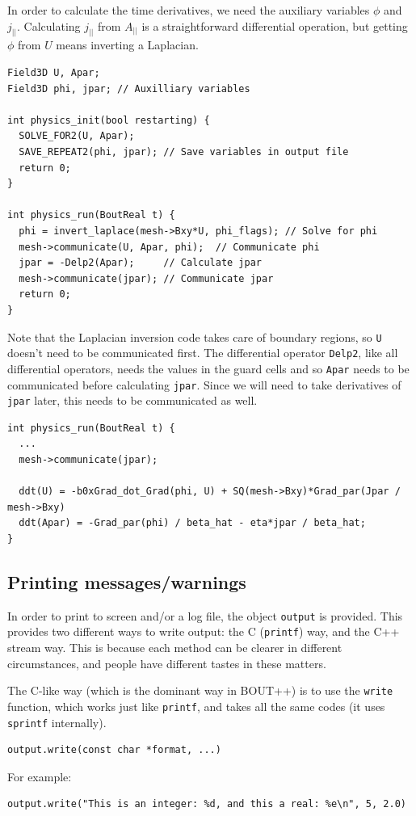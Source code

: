 \documentclass[12pt]{article}
\newcommand{\code}[1]{\texttt{#1}}
\begin{document}
In order to calculate the time derivatives, we need the auxiliary variables
$\phi$ and $j_{||}$. Calculating $j_{||}$ from $A_{||}$ is a straightforward
differential operation, but getting $\phi$ from $U$ means inverting a Laplacian.
\begin{lstlisting}
Field3D U, Apar;
Field3D phi, jpar; // Auxilliary variables

int physics_init(bool restarting) {
  SOLVE_FOR2(U, Apar);
  SAVE_REPEAT2(phi, jpar); // Save variables in output file
  return 0;
}

int physics_run(BoutReal t) {
  phi = invert_laplace(mesh->Bxy*U, phi_flags); // Solve for phi
  mesh->communicate(U, Apar, phi);  // Communicate phi
  jpar = -Delp2(Apar);     // Calculate jpar
  mesh->communicate(jpar); // Communicate jpar
  return 0;
}
\end{lstlisting}
Note that the Laplacian inversion code takes care of boundary regions,
so \lstinline!U! doesn't need to be communicated first. The differential operator
\lstinline!Delp2!, like all differential operators, needs the values
in the guard cells and so \lstinline!Apar! needs to be communicated
before calculating \lstinline!jpar!. Since we will need to take derivatives
of \lstinline!jpar! later, this needs to be communicated as well.
\begin{lstlisting}
int physics_run(BoutReal t) {
  ...
  mesh->communicate(jpar);

  ddt(U) = -b0xGrad_dot_Grad(phi, U) + SQ(mesh->Bxy)*Grad_par(Jpar / mesh->Bxy)
  ddt(Apar) = -Grad_par(phi) / beta_hat - eta*jpar / beta_hat;
}
\end{lstlisting}

\subsection{Printing messages/warnings}
\label{sec:printing}

In order to print to screen and/or a log file, the object \code{output} is provided.
This provides two different ways to write output: the C (\code{printf}) way, and the
C++ stream way. This is because each method can be clearer in different circumstances,
and people have different tastes in these matters.

The C-like way (which is the dominant way in BOUT++) is to use the \code{write} function,
which works just like \code{printf}, and takes all the same codes (it uses \code{sprintf}
internally). 
\begin{lstlisting}
output.write(const char *format, ...)
\end{lstlisting}
For example:
\begin{lstlisting}
output.write("This is an integer: %d, and this a real: %e\n", 5, 2.0)
\end{lstlisting}
\end{document}

